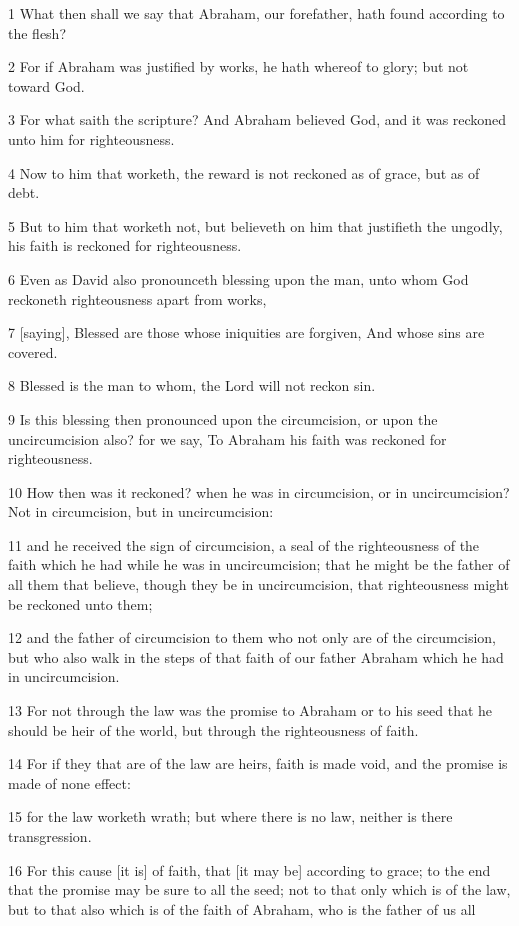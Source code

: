 \par 1 What then shall we say that Abraham, our forefather, hath found according to the flesh?
\par 2 For if Abraham was justified by works, he hath whereof to glory; but not toward God.
\par 3 For what saith the scripture? And Abraham believed God, and it was reckoned unto him for righteousness.
\par 4 Now to him that worketh, the reward is not reckoned as of grace, but as of debt.
\par 5 But to him that worketh not, but believeth on him that justifieth the ungodly, his faith is reckoned for righteousness.
\par 6 Even as David also pronounceth blessing upon the man, unto whom God reckoneth righteousness apart from works,
\par 7 [saying], Blessed are those whose iniquities are forgiven, And whose sins are covered.
\par 8 Blessed is the man to whom, the Lord will not reckon sin.
\par 9 Is this blessing then pronounced upon the circumcision, or upon the uncircumcision also? for we say, To Abraham his faith was reckoned for righteousness.
\par 10 How then was it reckoned? when he was in circumcision, or in uncircumcision? Not in circumcision, but in uncircumcision:
\par 11 and he received the sign of circumcision, a seal of the righteousness of the faith which he had while he was in uncircumcision; that he might be the father of all them that believe, though they be in uncircumcision, that righteousness might be reckoned unto them;
\par 12 and the father of circumcision to them who not only are of the circumcision, but who also walk in the steps of that faith of our father Abraham which he had in uncircumcision.
\par 13 For not through the law was the promise to Abraham or to his seed that he should be heir of the world, but through the righteousness of faith.
\par 14 For if they that are of the law are heirs, faith is made void, and the promise is made of none effect:
\par 15 for the law worketh wrath; but where there is no law, neither is there transgression.
\par 16 For this cause [it is] of faith, that [it may be] according to grace; to the end that the promise may be sure to all the seed; not to that only which is of the law, but to that also which is of the faith of Abraham, who is the father of us all
